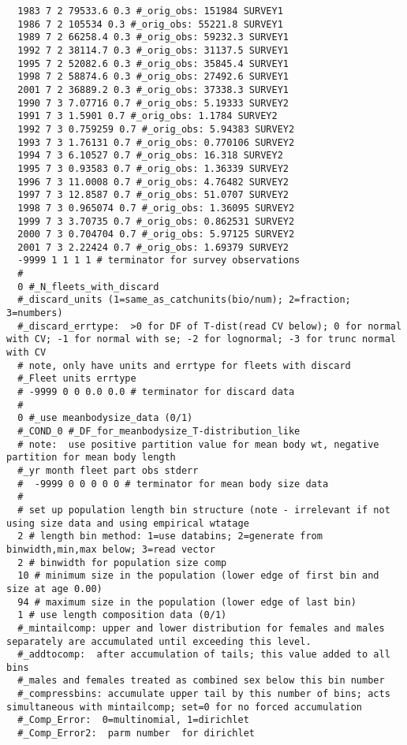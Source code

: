 \begin{landscape}
{\begin{verbatim}
  1983 7 2 79533.6 0.3 #_orig_obs: 151984 SURVEY1
  1986 7 2 105534 0.3 #_orig_obs: 55221.8 SURVEY1
  1989 7 2 66258.4 0.3 #_orig_obs: 59232.3 SURVEY1
  1992 7 2 38114.7 0.3 #_orig_obs: 31137.5 SURVEY1
  1995 7 2 52082.6 0.3 #_orig_obs: 35845.4 SURVEY1
  1998 7 2 58874.6 0.3 #_orig_obs: 27492.6 SURVEY1
  2001 7 2 36889.2 0.3 #_orig_obs: 37338.3 SURVEY1
  1990 7 3 7.07716 0.7 #_orig_obs: 5.19333 SURVEY2
  1991 7 3 1.5901 0.7 #_orig_obs: 1.1784 SURVEY2
  1992 7 3 0.759259 0.7 #_orig_obs: 5.94383 SURVEY2
  1993 7 3 1.76131 0.7 #_orig_obs: 0.770106 SURVEY2
  1994 7 3 6.10527 0.7 #_orig_obs: 16.318 SURVEY2
  1995 7 3 0.93583 0.7 #_orig_obs: 1.36339 SURVEY2
  1996 7 3 11.0008 0.7 #_orig_obs: 4.76482 SURVEY2
  1997 7 3 12.8587 0.7 #_orig_obs: 51.0707 SURVEY2
  1998 7 3 0.965074 0.7 #_orig_obs: 1.36095 SURVEY2
  1999 7 3 3.70735 0.7 #_orig_obs: 0.862531 SURVEY2
  2000 7 3 0.704704 0.7 #_orig_obs: 5.97125 SURVEY2
  2001 7 3 2.22424 0.7 #_orig_obs: 1.69379 SURVEY2
  -9999 1 1 1 1 # terminator for survey observations 
  #
  0 #_N_fleets_with_discard
  #_discard_units (1=same_as_catchunits(bio/num); 2=fraction; 3=numbers)
  #_discard_errtype:  >0 for DF of T-dist(read CV below); 0 for normal with CV; -1 for normal with se; -2 for lognormal; -3 for trunc normal with CV
  # note, only have units and errtype for fleets with discard 
  #_Fleet units errtype
  # -9999 0 0 0.0 0.0 # terminator for discard data 
  #
  0 #_use meanbodysize_data (0/1)
  #_COND_0 #_DF_for_meanbodysize_T-distribution_like
  # note:  use positive partition value for mean body wt, negative partition for mean body length 
  #_yr month fleet part obs stderr
  #  -9999 0 0 0 0 0 # terminator for mean body size data 
  #
  # set up population length bin structure (note - irrelevant if not using size data and using empirical wtatage
  2 # length bin method: 1=use databins; 2=generate from binwidth,min,max below; 3=read vector
  2 # binwidth for population size comp 
  10 # minimum size in the population (lower edge of first bin and size at age 0.00) 
  94 # maximum size in the population (lower edge of last bin) 
  1 # use length composition data (0/1)
  #_mintailcomp: upper and lower distribution for females and males separately are accumulated until exceeding this level.
  #_addtocomp:  after accumulation of tails; this value added to all bins
  #_males and females treated as combined sex below this bin number 
  #_compressbins: accumulate upper tail by this number of bins; acts simultaneous with mintailcomp; set=0 for no forced accumulation
  #_Comp_Error:  0=multinomial, 1=dirichlet
  #_Comp_Error2:  parm number  for dirichlet

\end{verbatim}}
\end{landscape}
